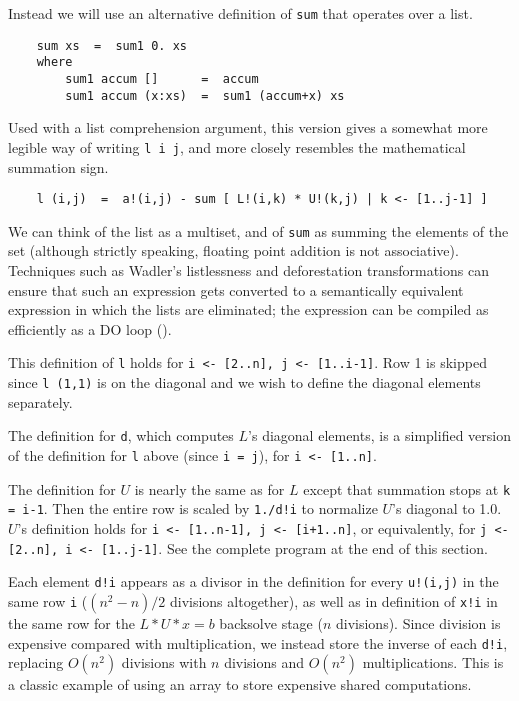 Instead we will use an alternative definition of {\tt sum}
that operates over a list.
\begin{verbatim}
    sum xs  =  sum1 0. xs
    where
        sum1 accum []      =  accum
        sum1 accum (x:xs)  =  sum1 (accum+x) xs
\end{verbatim}
Used with a list comprehension argument,
this version gives a somewhat more legible way of
writing {\tt l i j}, and more closely resembles the mathematical
summation sign.  
\begin{verbatim}
    l (i,j)  =  a!(i,j) - sum [ L!(i,k) * U!(k,j) | k <- [1..j-1] ]
\end{verbatim}
We can think of the list as a multiset, and of {\tt sum} as summing
the elements of the set (although strictly speaking, floating point
addition is not associative).  Techniques such as Wadler's
listlessness and deforestation transformations can ensure that such an
expression gets converted to a semantically equivalent expression in
which the lists are eliminated; the expression can be compiled as
efficiently as a DO loop (\cite{wadl84,wadl85b}).

This definition of {\tt l} holds for {\tt i <- [2..n], j <- [1..i-1]}.
Row 1 is skipped since {\tt l (1,1)} is on the diagonal and we wish to
define the diagonal elements separately.

    The definition for {\tt d}, which computes $L$'s diagonal elements,
is a simplified version of the definition for {\tt l} above
(since {\tt i = j}),  for {\tt i <- [1..n]}.

The definition for $U$ is nearly the same as for $L$ except that summation
stops at {\tt k = i-1}.  Then the entire row is scaled by
{\tt 1./d!i} to normalize $U$'s diagonal to 1.0.
$U$'s definition holds for {\tt i <- [1..n-1], j <- [i+1..n]},
or equivalently, for {\tt j <- [2..n], i <- [1..j-1]}.  See the
complete program at the end of this section.

    Each element {\tt d!i} appears as a divisor in the definition for  
every
{\tt u!(i,j)} in the same row {\tt i} ($(n^2 - n)/2$ divisions  
altogether),
as well as in definition of {\tt x!i} in the same row for the $L*U*x = b$
backsolve stage ($n$ divisions).  Since division is expensive compared  
with
multiplication, we instead store the inverse of each {\tt d!i}, replacing
$O(n^2)$ divisions with $n$ divisions and $O(n^2)$ multiplications.
This is a classic example of using an array to store expensive shared
computations.


